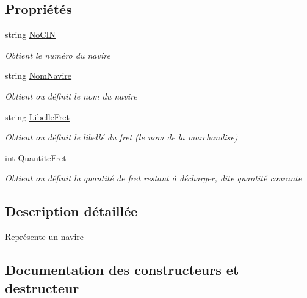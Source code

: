 \subsection*{Propriétés}
\begin{DoxyCompactItemize}
\item 
string \hyperlink{class_api_ouistreham_1_1_navire_ac8267ba06c607b546aeef33d706cef20}{No\+C\+IN}
\begin{DoxyCompactList}\small\item\em Obtient le numéro du navire \end{DoxyCompactList}\item 
string \hyperlink{class_api_ouistreham_1_1_navire_a3aff174dcbc00d36093a3f8298b4e840}{Nom\+Navire}
\begin{DoxyCompactList}\small\item\em Obtient ou définit le nom du navire \end{DoxyCompactList}\item 
string \hyperlink{class_api_ouistreham_1_1_navire_a68c36073e4a1d2a9bf4c0eb35ea8d5f4}{Libelle\+Fret}
\begin{DoxyCompactList}\small\item\em Obtient ou définit le libellé du fret (le nom de la marchandise) \end{DoxyCompactList}\item 
int \hyperlink{class_api_ouistreham_1_1_navire_a1a539404b69c16933471924afb87596c}{Quantite\+Fret}
\begin{DoxyCompactList}\small\item\em Obtient ou définit la quantité de fret restant à décharger, dite quantité courante \end{DoxyCompactList}\end{DoxyCompactItemize}


\subsection{Description détaillée}
Représente un navire 



\subsection{Documentation des constructeurs et destructeur}
\mbox{\label{class_api_ouistreham_1_1_navire_aa570acf88770400f8d2702256dce5a21}} 
